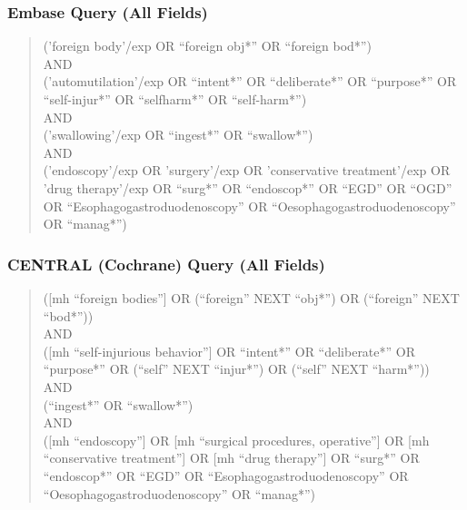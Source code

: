 \subsubsection{Embase Query (All Fields)}
\begin{quote}
('foreign body'/exp OR \enquote{foreign obj*} OR \enquote{foreign bod*})\\
AND\\
('automutilation'/exp OR \enquote{intent*} OR \enquote{deliberate*} OR \enquote{purpose*} OR \enquote{self-injur*} OR \enquote{selfharm*} OR \enquote{self-harm*})\\
AND\\
('swallowing'/exp OR \enquote{ingest*} OR \enquote{swallow*})\\
AND\\
('endoscopy'/exp OR 'surgery'/exp OR 'conservative treatment'/exp OR 'drug therapy'/exp OR \enquote{surg*} OR \enquote{endoscop*} OR \enquote{EGD} OR \enquote{OGD} OR \enquote{Esophagogastroduodenoscopy} OR \enquote{Oesophagogastroduodenoscopy} OR \enquote{manag*})
\end{quote}

\subsubsection{CENTRAL (Cochrane) Query (All Fields)}
\begin{quote}
([mh \enquote{foreign bodies}] OR (\enquote{foreign} NEXT \enquote{obj*}) OR (\enquote{foreign} NEXT \enquote{bod*}))\\
AND\\
([mh \enquote{self-injurious behavior}] OR \enquote{intent*} OR \enquote{deliberate*} OR \enquote{purpose*} OR (\enquote{self} NEXT \enquote{injur*}) OR (\enquote{self} NEXT \enquote{harm*}))\\
AND\\
(\enquote{ingest*} OR \enquote{swallow*})\\
AND\\
([mh \enquote{endoscopy}] OR [mh \enquote{surgical procedures, operative}] OR [mh \enquote{conservative treatment}] OR [mh \enquote{drug therapy}] OR \enquote{surg*} OR \enquote{endoscop*} OR \enquote{EGD} OR \enquote{Esophagogastroduodenoscopy} OR \enquote{Oesophagogastroduodenoscopy} OR \enquote{manag*})
\end{quote}

